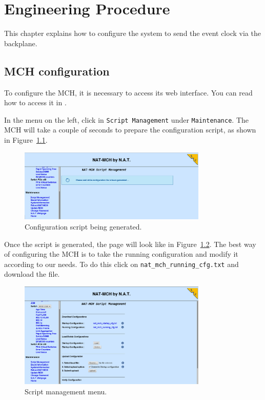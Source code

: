 \documentclass[11pt
  , a4paper
  , article
  , oneside
  , showtrims
]{memoir}
\begin{document}
\clearpage
\chapter{Engineering Procedure}
This chapter explains how to configure the system to send the event clock via the backplane.

\section{MCH configuration}
To configure the MCH, it is necessary to access its web interface. You can read how to access it in \citep{NATMCHWEBINTERFACE}.

In the menu on the left, click in \texttt{Script Management} under \texttt{Maintenance}. The MCH will take a couple of seconds to prepare the configuration script, as shown in Figure~\ref{fig:configfile}.
\begin{figure}[!htb]
  \centering
  \includegraphics[width=0.8\textwidth]{./pictures/Configuration_file.png}
  \caption{Configuration script being generated.}
  \label{fig:configfile}
\end{figure}

Once the script is generated, the page will look like in Figure~\ref{fig:scriptmanagement}. The best way of configuring the MCH is to take the running configuration and modify it according to our needs. To do this click on \texttt{nat\_mch\_running\_cfg.txt} and download the file.

\begin{figure}[!htb]
  \centering
  \includegraphics[width=0.8\textwidth]{./pictures/Script_management.png}
  \caption{Script management menu.}
  \label{fig:scriptmanagement}
\end{figure}
\end{document}
